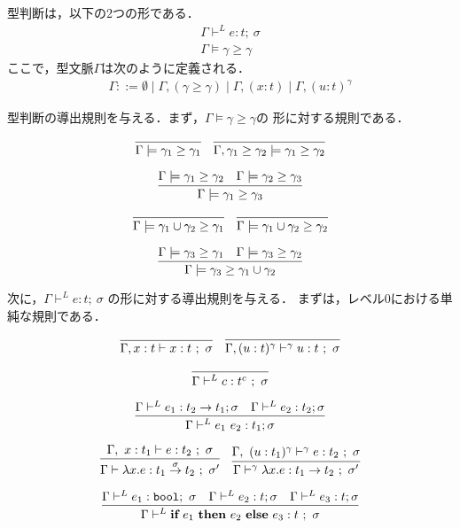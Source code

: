 \documentclass[T]{compsoft}
\newcommand\fun[2]{\lambda{#1}.{#2}}
\newcommand\boolT{\mbox{\texttt{bool}}}
\newcommand\funT[3]{{#1} \stackrel{#3}{\rightarrow} {#2}}
\newcommand\ord{\ge}
\newcommand\ift[3]{\textbf{if}~{#1}~\textbf{then}~{#2}~\textbf{else}~{#3}}
\theoremstyle{break}
\begin{document}
型判断は，以下の2つの形である．
\begin{align*}
  \Gamma \vdash^{L} e : t ;~\sigma \\
  \Gamma \models \gamma \ord \gamma
\end{align*}
ここで，型文脈$\Gamma$は次のように定義される．
\begin{align*}
  \Gamma ::= \emptyset
  \mid \Gamma, (\gamma \ord \gamma)
  \mid \Gamma, (x : t)
  \mid \Gamma, (u : t)^{\gamma}
\end{align*}

型判断の導出規則を与える．まず，$\Gamma \models \gamma \ord \gamma$の
形に対する規則である．

\[
  \infer
  {\Gamma \models \gamma_1 \ord \gamma_1}
  {}
\quad
  \infer
  {\Gamma, \gamma_1 \ord \gamma_2 \models \gamma_1 \ord \gamma_2}
  {}
\]

\[
  \infer
  {\Gamma \models \gamma_1 \ord \gamma_3}
  {\Gamma \models \gamma_1 \ord \gamma_2 & \Gamma \models \gamma_2 \ord \gamma_3}
\]

\[
  \infer
  {\Gamma \models \gamma_1 \cup \gamma_2 \ord \gamma_1}
  {}
\quad
  \infer
  {\Gamma \models \gamma_1 \cup \gamma_2 \ord \gamma_2}
  {}
\]

\[
  \infer
  {\Gamma \models \gamma_3 \ord \gamma_1 \cup \gamma_2}
  {\Gamma \models \gamma_3 \ord \gamma_1
  &\Gamma \models \gamma_3 \ord \gamma_2}
\]



次に，$\Gamma \vdash^{L} e : t ;~\sigma$ の形に対する導出規則を与える．
まずは，レベル0における単純な規則である．

\[
  \infer
  {\Gamma, x : t \vdash x : t ~;~ \sigma}
  {}
\quad
  \infer
  {\Gamma, (u : t)^\gamma \vdash^\gamma u : t ~;~ \sigma}
  {}
\]

\[
  \infer
  {\Gamma \vdash^{L} c : t^c ~;~\sigma}
  {}
\]

\[
  \infer
  {\Gamma \vdash^{L} e_1~ e_2 : t_1 ; \sigma}
  {\Gamma \vdash^{L} e_1 : t_2 \to t_1 ; \sigma
    & \Gamma \vdash^{L} e_2 : t_2  ; \sigma
  }
\]

\[
  \infer
  {\Gamma \vdash \fun{x}{e} : \funT{t_1}{t_2}{\sigma} ~;~\sigma'}
  {\Gamma,~x : t_1 \vdash e : t_2 ~;~ \sigma}
\quad
  \infer
  {\Gamma \vdash^\gamma \fun{x}{e} : \funT{t_1}{t_2}{} ~;~\sigma'}
  {\Gamma,~(u : t_1)^\gamma \vdash^\gamma e : t_2 ~;~ \sigma}
\]

\[
  \infer
  {\Gamma \vdash^{L} \ift{e_1}{e_2}{e_3} : t ~;~ \sigma}
  {\Gamma \vdash^{L} e_1 : \boolT ;~ \sigma
    & \Gamma \vdash^{L} e_2 : t ; \sigma
    & \Gamma \vdash^{L} e_3 : t ; \sigma}
\]
\end{document}
